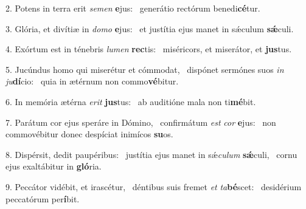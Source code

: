 2. Potens in terra erit \textit{se}\textit{men} \textbf{e}jus: \ast\  generátio rectórum benedi\textbf{cé}tur.\

3. Glória, et divítiæ in \textit{do}\textit{mo} \textbf{e}jus: \ast\  et justítia ejus manet in sǽculum \textbf{sǽ}culi.\

4. Exórtum est in ténebris \textit{lu}\textit{men} \textbf{rec}tis: \ast\  miséricors, et miserátor, et \textbf{jus}tus.\

5. Jucúndus homo qui miserétur et cómmodat, \dag\  dispónet sermónes suos \textit{in} \textit{ju}\textbf{dí}cio: \ast\  quia in ætérnum non commo\textbf{vé}bitur.\

6. In memória ætérna \textit{e}\textit{rit} \textbf{jus}tus: \ast\  ab auditióne mala non ti\textbf{mé}bit.\

7. Parátum cor ejus speráre in Dómino, \dag\  confirmátum \textit{est} \textit{cor} \textbf{e}jus: \ast\  non commovébitur donec despíciat inimícos \textbf{su}os.\

8. Dispérsit, dedit paupéribus: \dag\  justítia ejus manet in sǽ\textit{cu}\textit{lum} \textbf{sǽ}culi, \ast\  cornu ejus exaltábitur in \textbf{gló}ria.\

9. Peccátor vidébit, et irascétur, \dag\  déntibus suis fremet \textit{et} \textit{ta}\textbf{bé}scet: \ast\  desidérium peccatórum per\textbf{í}bit.\

